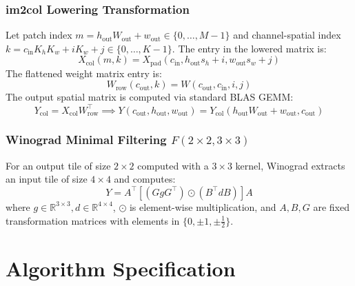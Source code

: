 \documentclass[11pt,a4paper]{article}
\theoremstyle{definition}
\begin{document}
\subsubsection{im2col Lowering Transformation}
Let patch index $m = h_{\text{out}} W_{\text{out}} + w_{\text{out}} \in \{0, \dots, M-1\}$ and channel-spatial index $k = c_{\text{in}} K_h K_w + i K_w + j \in \{0, \dots, K-1\}$. The entry in the lowered matrix is:
\begin{equation}
X_{\text{col}}(m, k) = X_{\text{pad}}(c_{\text{in}}, h_{\text{out}} s_h + i, w_{\text{out}} s_w + j)
\end{equation}
The flattened weight matrix entry is:
\begin{equation}
W_{\text{row}}(c_{\text{out}}, k) = W(c_{\text{out}}, c_{\text{in}}, i, j)
\end{equation}
The output spatial matrix is computed via standard BLAS GEMM:
\begin{equation}
Y_{\text{col}} = X_{\text{col}} W_{\text{row}}^\top \implies Y(c_{\text{out}}, h_{\text{out}}, w_{\text{out}}) = Y_{\text{col}}(h_{\text{out}} W_{\text{out}} + w_{\text{out}}, c_{\text{out}})
\end{equation}

\subsubsection{Winograd Minimal Filtering $F(2 \times 2, 3 \times 3)$}
For an output tile of size $2 \times 2$ computed with a $3 \times 3$ kernel, Winograd extracts an input tile of size $4 \times 4$ and computes:
\begin{equation}
Y = A^\top \left[ (G g G^\top) \odot (B^\top d B) \right] A
\end{equation}
where $g \in \mathbb{R}^{3 \times 3}, d \in \mathbb{R}^{4 \times 4}$, $\odot$ is element-wise multiplication, and $A, B, G$ are fixed transformation matrices with elements in $\{0, \pm 1, \pm \frac{1}{2}\}$.

\section{Algorithm Specification}
\end{document}
